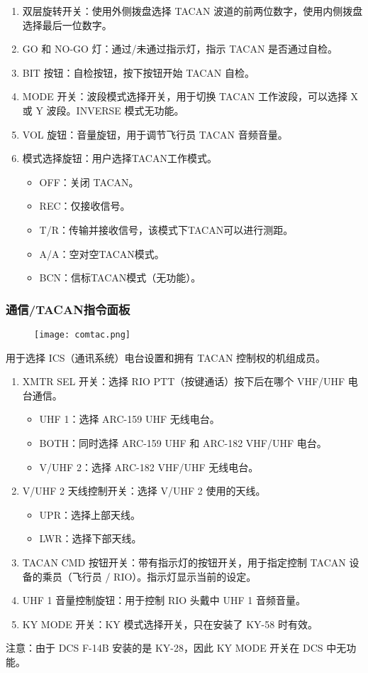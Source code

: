 \begin{enumerate}
  \item 双层旋转开关：使用外侧拨盘选择 TACAN 波道的前两位数字，使用内侧拨盘选择最后一位数字。
  \item GO 和 NO-GO 灯：通过/未通过指示灯，指示 TACAN 是否通过自检。
  \item BIT 按钮：自检按钮，按下按钮开始 TACAN 自检。
  \item MODE 开关：波段模式选择开关，用于切换 TACAN 工作波段，可以选择 X 或 Y 波段。INVERSE 模式无功能。
  \item VOL 旋钮：音量旋钮，用于调节飞行员 TACAN 音频音量。
  \item 模式选择旋钮：用户选择TACAN工作模式。
  \begin{itemize}
    \item OFF：关闭 TACAN。
    \item REC：仅接收信号。
    \item T/R：传输并接收信号，该模式下TACAN可以进行测距。
    \item A/A：空对空TACAN模式。
    \item BCN：信标TACAN模式（无功能）。
  \end{itemize}
\end{enumerate}

\subsubsection{通信/TACAN指令面板}
\begin{figure}[htb]
  \center
  \texttt{[image: comtac.png]}
\end{figure}
用于选择 ICS（通讯系统）电台设置和拥有 TACAN 控制权的机组成员。

\begin{enumerate}
  \item XMTR SEL 开关：选择 RIO PTT（按键通话）按下后在哪个 VHF/UHF 电台通信。
  \begin{itemize}
    \item UHF 1：选择 ARC-159 UHF 无线电台。
    \item BOTH：同时选择 ARC-159 UHF 和 ARC-182 VHF/UHF 电台。
    \item V/UHF 2：选择 ARC-182 VHF/UHF 无线电台。
  \end{itemize}
  \item V/UHF 2 天线控制开关：选择 V/UHF 2 使用的天线。
  \begin{itemize}
    \item UPR：选择上部天线。
    \item LWR：选择下部天线。
  \end{itemize}
  \item TACAN CMD 按钮开关：带有指示灯的按钮开关，用于指定控制 TACAN 设备的乘员（飞行员 / RIO）。指示灯显示当前的设定。
  \item UHF 1 音量控制旋钮：用于控制 RIO 头戴中 UHF 1 音频音量。
  \item KY MODE 开关：KY 模式选择开关，只在安装了 KY-58 时有效。
\end{enumerate}
注意：由于 DCS F-14B 安装的是 KY-28，因此 KY MODE 开关在 DCS 中无功能。

